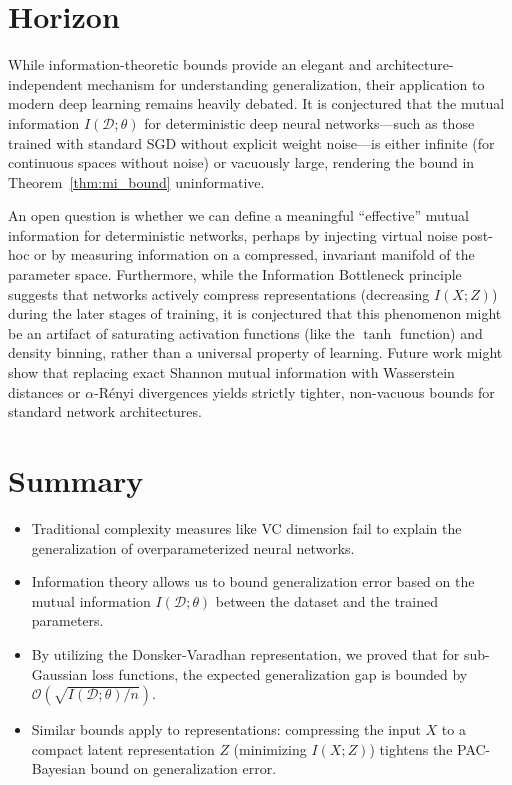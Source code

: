 \section{Horizon}
\begin{horizon}
While information-theoretic bounds provide an elegant and architecture-independent mechanism for understanding generalization, their application to modern deep learning remains heavily debated. It is conjectured that the mutual information $I(\mathcal{D}; \theta)$ for deterministic deep neural networks---such as those trained with standard SGD without explicit weight noise---is either infinite (for continuous spaces without noise) or vacuously large, rendering the bound in Theorem~\ref{thm:mi_bound} uninformative. 

An open question is whether we can define a meaningful ``effective'' mutual information for deterministic networks, perhaps by injecting virtual noise post-hoc or by measuring information on a compressed, invariant manifold of the parameter space. Furthermore, while the Information Bottleneck principle suggests that networks actively compress representations (decreasing $I(X; Z)$) during the later stages of training, it is conjectured that this phenomenon might be an artifact of saturating activation functions (like the $\tanh$ function) and density binning, rather than a universal property of learning. Future work might show that replacing exact Shannon mutual information with Wasserstein distances or $\alpha$-R\'enyi divergences yields strictly tighter, non-vacuous bounds for standard network architectures.
\end{horizon}

\section{Summary}
\begin{itemize}
    \item Traditional complexity measures like VC dimension fail to explain the generalization of overparameterized neural networks.
    \item Information theory allows us to bound generalization error based on the mutual information $I(\mathcal{D}; \theta)$ between the dataset and the trained parameters.
    \item By utilizing the Donsker-Varadhan representation, we proved that for sub-Gaussian loss functions, the expected generalization gap is bounded by $\mathcal{O}(\sqrt{I(\mathcal{D}; \theta)/n})$.
    \item Similar bounds apply to representations: compressing the input $X$ to a compact latent representation $Z$ (minimizing $I(X; Z)$) tightens the PAC-Bayesian bound on generalization error.
\end{itemize}


